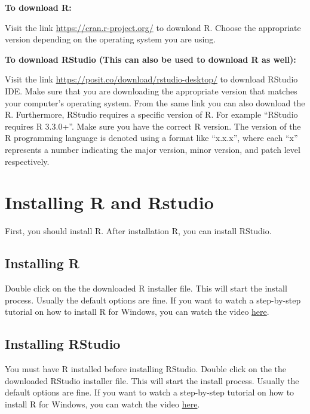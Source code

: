 \documentclass[
  letterpaper,
  DIV=11,
  numbers=noendperiod]{scrreprt}
\begin{document}
\textbf{To download R:}

Visit the link \url{https://cran.r-project.org/} to download R. Choose
the appropriate version depending on the operating system you are using.

\textbf{To download RStudio (This can also be used to download R as
well):}

Visit the link \url{https://posit.co/download/rstudio-desktop/} to
download RStudio IDE. Make sure that you are downloading the appropriate
version that matches your computer's operating system. From the same
link you can also download the R. Furthermore, RStudio requires a
specific version of R. For example ``RStudio requires R 3.3.0+''. Make
sure you have the correct R version. The version of the R programming
language is denoted using a format like ``x.x.x'', where each ``x''
represents a number indicating the major version, minor version, and
patch level respectively.

\hypertarget{installing-r-and-rstudio}{%
\section{Installing R and Rstudio}\label{installing-r-and-rstudio}}

First, you should install R. After installation R, you can install
RStudio.

\hypertarget{installing-r}{%
\subsection{Installing R}\label{installing-r}}

Double click on the the downloaded R installer file. This will start the
install process. Usually the default options are fine. If you want to
watch a step-by-step tutorial on how to install R for Windows, you can
watch the video
\href{https://www.youtube.com/watch?v=aRwxsAEoRzs}{here}.

\hypertarget{installing-rstudio}{%
\subsection{Installing RStudio}\label{installing-rstudio}}

You must have R installed before installing RStudio. Double click on the
the downloaded RStudio installer file. This will start the install
process. Usually the default options are fine. If you want to watch a
step-by-step tutorial on how to install R for Windows, you can watch the
video \href{https://www.youtube.com/watch?v=Q1NRj2Dzdn0}{here}.
\end{document}

